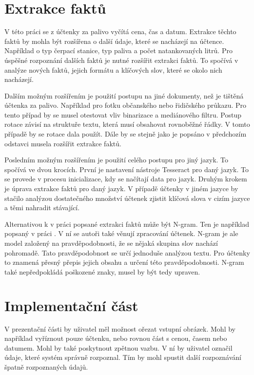 \documentclass[thesis=B,czech]{FITthesis}[2019/12/23]
\begin{document}
\newpage
\section{Extrakce faktů}
V této práci se z účtenky za palivo vyčítá cena, čas a datum. Extrakce těchto faktů by mohla být rozšířena o další údaje, které se nacházejí na účtence. Například o typ čerpací stanice, typ paliva a počet natankovaných litrů. Pro úspěšné rozpoznání dalších faktů je nutné rozšířit extrakci faktů. To spočívá v analýze nových faktů, jejich formátu a klíčových slov, které se okolo nich nacházejí.

Dalším možným rozšířením je použití postupu na jiné dokumenty, než je tištěná účtenka za palivo. Například pro fotku občanského nebo řidičského průkazu. Pro tento případ by se musel otestovat vliv binarizace a mediánového filtru. Postup rotace závisí na struktuře textu, která musí obsahovat rovnoběžné řádky. V tomto případě by se rotace dala použít. Dále by se stejně jako je popsáno v předchozím odstavci musela rozšířit extrakce faktů.

Posledním možným rozšířením je použití celého postupu pro jiný jazyk. To spočívá ve dvou krocích. První je nastavení nástroje Tesseract pro daný jazyk. To se provede v procesu inicializace, kdy se načítají data pro jazyk. Druhým krokem je úprava extrakce faktů pro daný jazyk. V případě účtenky v jiném jazyce by stačilo analýzou dostatečného množství účtenek zjistit klíčová slova v cizím jazyce a těmi nahradit stávající.

Alternativou k v práci popsané extrakci faktů může být \mbox{N-gram}. Ten je například popsaný v práci \cite{Odd2018}. V ní se autoři také věnují zpracování účtenek. N-gram je ale model založený na pravděpodobnosti, že se nějaká skupina slov nachází pohromadě. Tato pravděpodobnost se určí jednoduše analýzou textu. Pro účtenky to znamená přesný přepis jejich obsahu a určení této pravděpodobnosti. N-gram také nepředpokládá poškozené znaky, musel by být tedy upraven.


\section{Implementační část}
\label{sec:impl-better}
V prezentační části by uživatel měl možnost ořezat vstupní obrázek. Mohl by například vyříznout pouze účtenku, nebo rovnou část s cenou, časem nebo datumem. Mohl by také poskytnout zpětnou vazbu. V ní by uživatel označil údaje, které systém správně rozpoznal. Tím by mohl spustit další rozpoznávání špatně rozpoznaných údajů.
\end{document}
